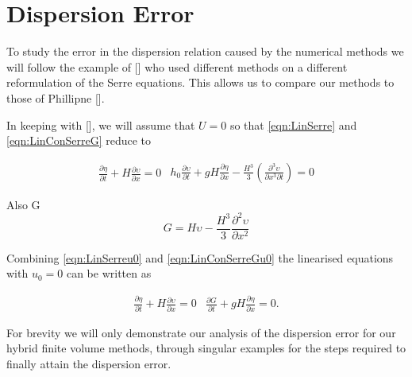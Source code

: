 \section{Dispersion Error}
To study the error in the dispersion relation caused by the numerical methods we will follow the example of [] who used different methods on a different reformulation of the Serre equations. This allows us to compare our methods to those of Phillipne [].

In keeping with [], we will assume that $U = 0$ so that \eqref{eqn:LinSerre} and \eqref{eqn:LinConSerreG} reduce to

\begin{subequations}
	\begin{gather}
	\label{eqn:LinContu0}
	\frac{\partial  \eta}{\partial  t} + H\frac{\partial  \upsilon}{\partial  x} = 0
	\end{gather}
	
	\begin{gather}
	\label{eqn:LineMomeu0}
	h_0\frac{\partial  \upsilon}{\partial  t} + g H \frac{\partial  \eta}{\partial  x} - \frac{H^3}{3}\left(\frac{\partial^3  \upsilon}{\partial  x^3 \partial  t}  \right)  = 0
	\end{gather}
	\label{eqn:LinSerreu0}	
\end{subequations}

Also G
\begin{equation}
G = H\upsilon -\frac{H^3}{3} \frac{\partial^2 \upsilon}{\partial x^2}
\label{eqn:LinConSerreGu0}	
\end{equation}

Combining \eqref{eqn:LinSerreu0} and \eqref{eqn:LinConSerreGu0} the linearised equations with $u_0=0$ can be written as

\begin{subequations}
	\begin{gather}
	\label{eqn:LinContG}
	\frac{\partial  \eta}{\partial  t} + H\frac{\partial  \upsilon}{\partial  x} = 0
	\end{gather}
	
	\begin{gather}
	\label{eqn:LineMomeG}
	\frac{\partial  G}{\partial  t} + g H \frac{\partial  \eta}{\partial  x}  = 0.
	\end{gather}
	\label{eqn:LinSerreG}	
\end{subequations}

For brevity we will only demonstrate our analysis of the dispersion error for our hybrid finite volume methods, through singular examples for the steps required to finally attain the dispersion error. 

